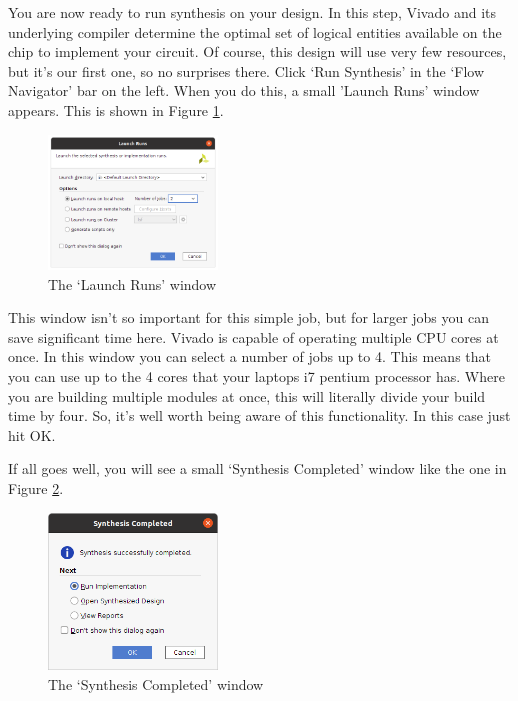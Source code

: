 \documentclass[../physical_computing.tex]{subfiles}
\begin{document}
You are now ready to run synthesis on your design. In this step, Vivado and its underlying compiler determine the optimal set of logical entities available on the chip to implement your circuit. Of course, this design will use very few resources, but it's our first one, so no surprises there. Click `Run Synthesis' in the `Flow Navigator' bar on the left. When you do this, a small 'Launch Runs' window appears. This is shown in Figure \ref{fig:launch_runs}. 

\begin{figure}[htbp]
    \centering
    \includegraphics[width=0.4\textwidth]{chapter_1/figures/launch_runs.png}
    \caption{The `Launch Runs' window}
    \label{fig:launch_runs}
\end{figure}

This window isn't so important for this simple job, but for larger jobs you can save significant time here. Vivado is capable of operating multiple CPU cores at once. In this window you can select a number of jobs up to 4. This means that you can use up to the 4 cores that your laptops i7 pentium processor has. Where you are building multiple modules at once, this will literally divide your build time by four. So, it's well worth being aware of this functionality. In this case just hit OK.

If all goes well, you will see a small `Synthesis Completed' window like the one in Figure \ref{fig:synthesis_completed}. 

\begin{figure}[htbp]
    \centering
    \includegraphics[width=0.4\textwidth]{chapter_1/figures/synthesis_completed.png}
    \caption{The `Synthesis Completed' window}
    \label{fig:synthesis_completed}
\end{figure}
\end{document}
